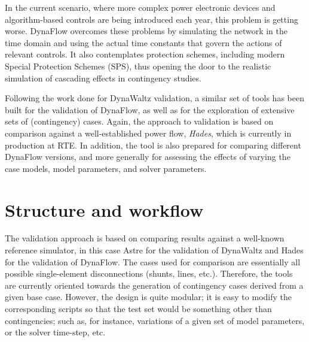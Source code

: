 \documentclass[conference]{IEEEtran}
\begin{document}
In the current scenario, where more complex power electronic devices and
algorithm-based controls are being introduced each year, this problem is getting
worse. DynaFlow overcomes these problems by simulating the network in the time
domain and using the actual time constants that govern the actions of relevant
controls. It also contemplates protection schemes, including modern Special
Protection Schemes (SPS), thus opening the door to the realistic simulation of
cascading effects in contingency studies.

Following the work done for DynaWaltz validation, a similar set of
tools has been built for the validation of DynaFlow, as well as for the exploration of
extensive sets of (contingency) cases.  Again, the approach to validation is
based on comparison against a well-established power flow, \emph{Hades}, which
is currently in production at RTE. In addition, the tool is also prepared
for comparing different DynaFlow versions, and more generally for assessing the
effects of varying the case models, model parameters, and solver parameters.




\section{Structure and workflow}

The validation approach is based on comparing results against a well-known
reference simulator, in this case Astre for the
validation of DynaWaltz and Hades for the validation of DynaFlow. The cases
used for comparison are essentially all possible single-element disconnections
(shunts, lines, etc.). Therefore, the tools are currently oriented towards the
generation of contingency cases derived from a given base case. However, the
design is quite modular; it is easy to modify the corresponding scripts so that
the test set would be something other than contingencies; such as, for instance,
variations of a given set of model parameters, or the solver time-step, etc.
\end{document}
